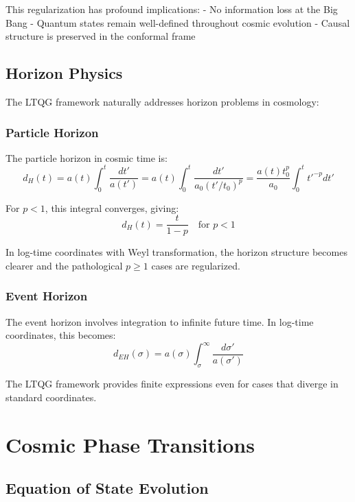 \documentclass[11pt,a4paper]{article}
\begin{document}
This regularization has profound implications:
- No information loss at the Big Bang
- Quantum states remain well-defined throughout cosmic evolution
- Causal structure is preserved in the conformal frame

\subsection{Horizon Physics}

The LTQG framework naturally addresses horizon problems in cosmology:

\subsubsection{Particle Horizon}

The particle horizon in cosmic time is:
\begin{equation}
d_H(t) = a(t) \int_0^t \frac{dt'}{a(t')} = a(t) \int_0^t \frac{dt'}{a_0 (t'/t_0)^p} = \frac{a(t) t_0^p}{a_0} \int_0^t t'^{-p} dt'
\end{equation}

For $p < 1$, this integral converges, giving:
\begin{equation}
d_H(t) = \frac{t}{1-p} \quad \text{for } p < 1
\end{equation}

In log-time coordinates with Weyl transformation, the horizon structure becomes clearer and the pathological $p \geq 1$ cases are regularized.

\subsubsection{Event Horizon}

The event horizon involves integration to infinite future time. In log-time coordinates, this becomes:
\begin{equation}
d_{EH}(\sigma) = a(\sigma) \int_{\sigma}^{\infty} \frac{d\sigma'}{a(\sigma')}
\end{equation}

The LTQG framework provides finite expressions even for cases that diverge in standard coordinates.

\section{Cosmic Phase Transitions}

\subsection{Equation of State Evolution}
\end{document}

